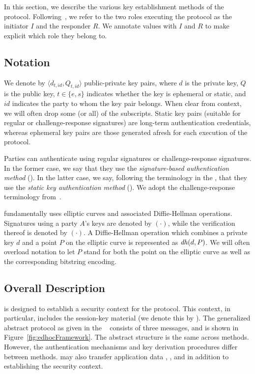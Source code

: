 In this section, we describe the various key establishment methods of the
\mEdhoc{} protocol.
%
Following~\cite{Norr21}, we refer to the two roles executing the protocol as
the initiator $I$ and the responder $R$.
%
We annotate values with $I$ and $R$ to make explicit which role they belong
to.
%

\subsection{Notation}
\label{sec:notation}
We denote by $\langle d_{t, \mathit{id}}, Q_{t, \mathit{id}}\rangle$
public-private key pairs, where $d$ is the private key, $Q$ is the public key,
$t \in \{e, s\}$ indicates whether the key is ephemeral or static,
and $\mathit{id}$ indicates the party to whom the key pair belongs.
%
When clear from context, we will often drop some (or all) of the subscripts.
%
Static key pairs (suitable for regular or challenge-response signatures)
are long-term authentication credentials, whereas ephemeral key pairs are
those generated afresh for each execution of the protocol.
%

Parties can authenticate using regular signatures or challenge-response
signatures.
%
In the former case, we say that they use the
\emph{signature-based authentication method} (\mSig{}).
%
In the latter case, we say, following the terminology in the \mSpec{},
that they use the \emph{static key authentication method} (\mStat{}).
%
We adopt the challenge-response terminology
from~\cite{DBLP:conf/crypto/Krawczyk05}.
%

\mEdhoc{} fundamentally uses elliptic curves and associated Diffie-Hellman
operations.
%
Signatures using a party $A$'s keys are denoted by $(\cdot)$, while
the verification thereof is denoted by $(\cdot)$.
%
A Diffie-Hellman operation which combines a private key $d$ and a point $P$
on the elliptic curve is represented as $\mathit{dh}(d, P)$.
%
We will often overload notation to let $P$ stand for both the point on the
elliptic curve as well as the corresponding bitstring encoding.

\subsection{Overall Description}
\label{sec:description}
\mEdhoc{} is designed to establish a security context for the \mOscore{} protocol.
%
This context, in particular, includes the session-key material (we denote this by
\mSessKey{}).
%
The generalized abstract protocol as given in the \mSpec{}~\cite{our-analysis-selander-lake-edhoc-00} consists of three
messages, and is shown in Figure~\ref{fig:edhocFramework}.
%
The abstract structure is the same across methods.
%
However, the authentication mechanisms and key derivation procedures differ between
methods.
%
\mEdhoc{} may also transfer application data \mADone{}, \mADtwo{}, and \mADthree{} in
addition to establishing the \mOscore{} security context.
%

